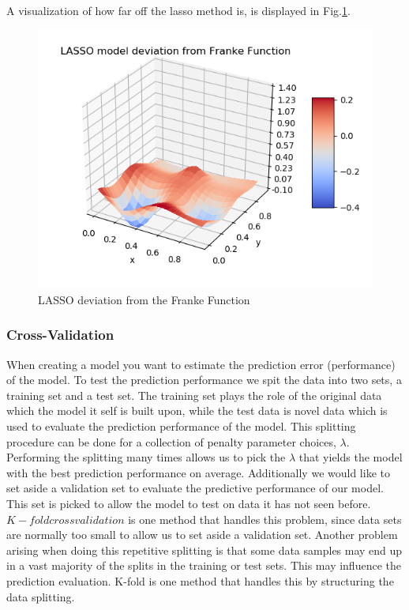 \documentclass[a4paper,11pt,twocolumn]{article}
\begin{document}
A visualization of how far off the lasso method is, is displayed in Fig.\ref{lassodeviation}.
\begin{figure}[h]
\centering
\includegraphics[scale=0.75]{lassodeviation}
\caption{LASSO deviation from the Franke Function}
\label{lassodeviation}
\end{figure}

\subsubsection{Cross-Validation}

When creating a model you want to estimate the prediction error (performance) of the model. To test the prediction performance we spit the data into two sets, a training set and a test set. The training set plays the role of the original data which the model it self is built upon, while the test data is novel data which is used to evaluate the prediction performance of the model. This splitting procedure can be done for a collection of penalty parameter choices, $\lambda$. Performing the splitting many times allows us to pick the $\lambda$ that yields the model with the best prediction performance on average. Additionally we would like to set aside a validation set to evaluate the predictive performance of our model. This set is picked to allow the model to test on data it has not seen before.\cite{slides} $K-fold cross validation$ is one method that handles this problem, since data sets are normally too small to allow us to set aside a validation set. Another problem arising when doing this repetitive splitting is that some data samples may end up in a vast majority of the splits in the training or test sets. This may influence the prediction evaluation. K-fold is one method that handles this by structuring the data splitting.\cite{Hastie}\cite{slides}
\end{document}
